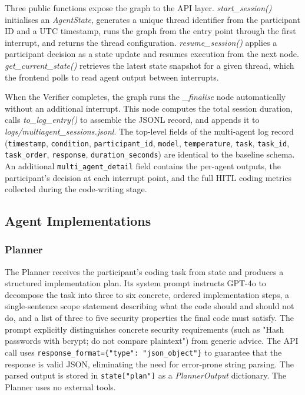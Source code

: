 Three public functions expose the graph to the API layer. \textit{start\_session()} initialises an \textit{AgentState}, generates a unique thread identifier from the participant ID and a UTC timestamp, runs the graph from the entry point through the first interrupt, and returns the thread configuration. \textit{resume\_session()} applies a participant decision as a state update and resumes execution from the next node. \textit{get\_current\_state()} retrieves the latest state snapshot for a given thread, which the frontend polls to read agent output between interrupts.

When the Verifier completes, the graph runs the \textit{\_finalise} node automatically without an additional interrupt. This node computes the total session duration, calls \textit{to\_log\_entry()} to assemble the JSONL record, and appends it to \textit{logs/multiagent\_sessions.jsonl}. The top-level fields of the multi-agent log record (\texttt{timestamp}, \texttt{condition}, \texttt{participant\_id}, \texttt{model}, \texttt{temperature}, \texttt{task}, \texttt{task\_id}, \texttt{task\_order}, \texttt{response}, \texttt{duration\_seconds}) are identical to the baseline schema. An additional \texttt{multi\_agent\_detail} field contains the per-agent outputs, the participant's decision at each interrupt point, and the full HITL coding metrics collected during the code-writing stage.

\subsection{Agent Implementations}

\subsubsection*{Planner}

The Planner receives the participant's coding task from state and produces a structured implementation plan. Its system prompt instructs GPT-4o to decompose the task into three to six concrete, ordered implementation steps, a single-sentence scope statement describing what the code should and should not do, and a list of three to five security properties the final code must satisfy. The prompt explicitly distinguishes concrete security requirements (such as "Hash passwords with bcrypt; do not compare plaintext") from generic advice. The API call uses \texttt{response\_format=\{"type": "json\_object"\}} to guarantee that the response is valid JSON, eliminating the need for error-prone string parsing. The parsed output is stored in \texttt{state["plan"]} as a \textit{PlannerOutput} dictionary. The Planner uses no external tools.

